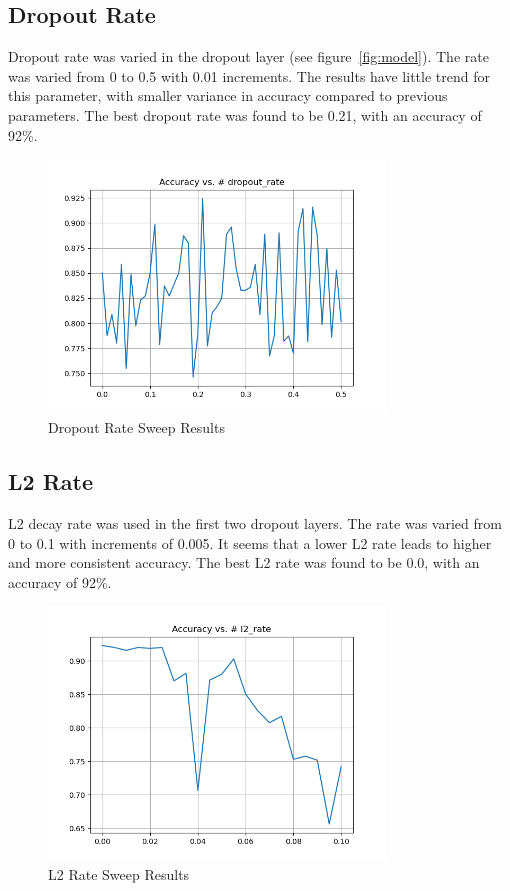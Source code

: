 \documentclass{article}
\begin{document}
\subsection{Dropout Rate}

Dropout rate was varied in the dropout layer (see figure~\ref{fig:model}). The rate was varied from 0 to 0.5 with 0.01 increments. The results have little trend for this parameter, with smaller variance in accuracy compared to previous parameters. The best dropout rate was found to be 0.21, with an accuracy of 92\%.

\begin{figure}[H]
    \centering
    \includegraphics[width=0.8\textwidth]{../media/dropout_rate_sweep.png}
    \caption{Dropout Rate Sweep Results}
    \label{fig:dropout}
\end{figure}


\subsection{L2 Rate}

L2 decay rate was used in the first two dropout layers. The rate was varied from 0 to 0.1 with increments of 0.005. It seems that a lower L2 rate leads to higher and more consistent accuracy. The best L2 rate was found to be 0.0, with an accuracy of 92\%.

\begin{figure}[H]
    \centering
    \includegraphics[width=0.8\textwidth]{../media/l2_rate_sweep.png}
    \caption{L2 Rate Sweep Results}
    \label{fig:l2}
\end{figure}
\end{document}
